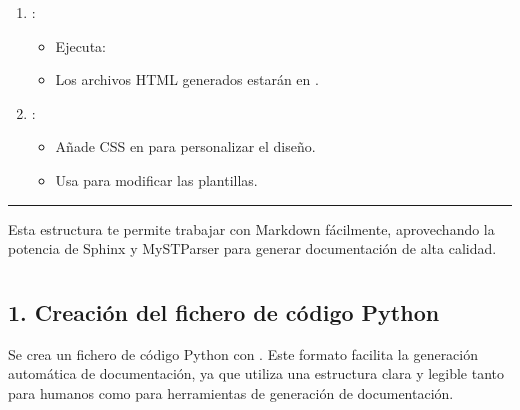 \documentclass[a4paper,10pt,oneside,spanish,openany]{sphinxmanual}
\begin{document}
\begin{enumerate}
\item {} 
\sphinxAtStartPar
{}:
\begin{itemize}
\item {} 
\sphinxAtStartPar
Ejecuta:

\sphinxAtStartPar
{}

\item {} 
\sphinxAtStartPar
Los archivos HTML generados estarán en .

\end{itemize}

\item {} 
\sphinxAtStartPar
{}:
\begin{itemize}
\item {} 
\sphinxAtStartPar
Añade CSS en  para personalizar el diseño.

\item {} 
\sphinxAtStartPar
Usa  para modificar las plantillas.

\end{itemize}

\end{enumerate}


\bigskip\hrule\bigskip


\sphinxAtStartPar
Esta estructura te permite trabajar con Markdown fácilmente, aprovechando la potencia de Sphinx y MyST\sphinxhyphen{}Parser para generar documentación de alta calidad.

\sphinxstepscope

\sphinxstepscope

\sphinxstepscope


\section{}
\label{\detokenize{configuracion_inicial/007.Creacion_de_ficheros_de_codigo_y_generacion_automatica_de_documentacion:creacion-de-ficheros-de-codigo-y-generacion-automatica-de-documentacion}}\label{\detokenize{configuracion_inicial/007.Creacion_de_ficheros_de_codigo_y_generacion_automatica_de_documentacion::doc}}

\subsection{1. Creación del fichero de código Python}
\label{\detokenize{configuracion_inicial/007.Creacion_de_ficheros_de_codigo_y_generacion_automatica_de_documentacion:creacion-del-fichero-de-codigo-python}}
\sphinxAtStartPar
Se crea un fichero de código Python con . Este formato facilita la generación automática de documentación, ya que utiliza una estructura clara y legible tanto para humanos como para herramientas de generación de documentación.
\end{document}
